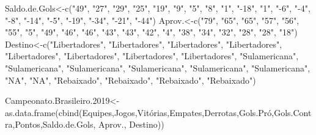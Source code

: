 \documentclass[
]{book}
\newenvironment{Shaded}{\begin{snugshade}}{\end{snugshade}}
\newcommand{\FloatTok}[1]{\textcolor[rgb]{0.00,0.00,0.81}{#1}}
\newcommand{\FunctionTok}[1]{\textcolor[rgb]{0.00,0.00,0.00}{#1}}
\newcommand{\NormalTok}[1]{#1}
\newcommand{\OtherTok}[1]{\textcolor[rgb]{0.56,0.35,0.01}{#1}}
\newcommand{\StringTok}[1]{\textcolor[rgb]{0.31,0.60,0.02}{#1}}
\begin{document}
\begin{Shaded}
\begin{Highlighting}[]
\NormalTok{Saldo.de.Gols}\OtherTok{\textless{}{-}}\FunctionTok{c}\NormalTok{(}\StringTok{"49"}\NormalTok{,  }\StringTok{"27"}\NormalTok{,   }\StringTok{"29"}\NormalTok{,   }\StringTok{"25"}\NormalTok{,   }\StringTok{"19"}\NormalTok{,   }\StringTok{"9"}\NormalTok{,    }\StringTok{"5"}\NormalTok{,    }\StringTok{"8"}\NormalTok{,    }\StringTok{"1"}\NormalTok{,    }\StringTok{"{-}18"}\NormalTok{,  }\StringTok{"1"}\NormalTok{,    }\StringTok{"{-}6"}\NormalTok{,   }\StringTok{"{-}4"}\NormalTok{,   }\StringTok{"{-}8"}\NormalTok{,   }\StringTok{"{-}14"}\NormalTok{,  }\StringTok{"{-}5"}\NormalTok{,   }\StringTok{"{-}19"}\NormalTok{,  }\StringTok{"{-}34"}\NormalTok{,  }\StringTok{"{-}21"}\NormalTok{,  }\StringTok{"{-}44"}\NormalTok{)}
\NormalTok{Aprov.}\OtherTok{\textless{}{-}}\FunctionTok{c}\NormalTok{(}\StringTok{"79"}\NormalTok{, }\StringTok{"65"}\NormalTok{,   }\StringTok{"65"}\NormalTok{,   }\StringTok{"57"}\NormalTok{,   }\StringTok{"56"}\NormalTok{,   }\StringTok{"55"}\NormalTok{,   }\StringTok{"5"}\NormalTok{,    }\StringTok{"49"}\NormalTok{,   }\StringTok{"46"}\NormalTok{,   }\StringTok{"46"}\NormalTok{,   }\StringTok{"43"}\NormalTok{,   }\StringTok{"43"}\NormalTok{,   }\StringTok{"42"}\NormalTok{,   }\StringTok{"4"}\NormalTok{,    }\StringTok{"38"}\NormalTok{,   }\StringTok{"34"}\NormalTok{,   }\StringTok{"32"}\NormalTok{,   }\StringTok{"28"}\NormalTok{,   }\StringTok{"28"}\NormalTok{,   }\StringTok{"18"}\NormalTok{)}
\NormalTok{Destino}\OtherTok{\textless{}{-}}\FunctionTok{c}\NormalTok{(}\StringTok{"Libertadores"}\NormalTok{,  }\StringTok{"Libertadores"}\NormalTok{, }\StringTok{"Libertadores"}\NormalTok{, }\StringTok{"Libertadores"}\NormalTok{, }\StringTok{"Libertadores"}\NormalTok{, }\StringTok{"Libertadores"}\NormalTok{, }\StringTok{"Libertadores"}\NormalTok{, }\StringTok{"Libertadores"}\NormalTok{, }\StringTok{"Sulamericana"}\NormalTok{, }\StringTok{"Sulamericana"}\NormalTok{, }\StringTok{"Sulamericana"}\NormalTok{, }\StringTok{"Sulamericana"}\NormalTok{, }\StringTok{"Sulamericana"}\NormalTok{, }\StringTok{"Sulamericana"}\NormalTok{, }\StringTok{"NA"}\NormalTok{,   }\StringTok{"NA"}\NormalTok{,   }\StringTok{"Rebaixado"}\NormalTok{,    }\StringTok{"Rebaixado"}\NormalTok{,    }\StringTok{"Rebaixado"}\NormalTok{,    }\StringTok{"Rebaixado"}\NormalTok{)}

\NormalTok{Campeonato.Brasileiro}\FloatTok{.2019}\OtherTok{\textless{}{-}}\FunctionTok{as.data.frame}\NormalTok{(}\FunctionTok{cbind}\NormalTok{(Equipes,Jogos,Vitórias,Empates,Derrotas,Gols.Pró,Gols.Contra,Pontos,Saldo.de.Gols, Aprov., Destino))}
\end{Highlighting}
\end{Shaded}
\end{document}
